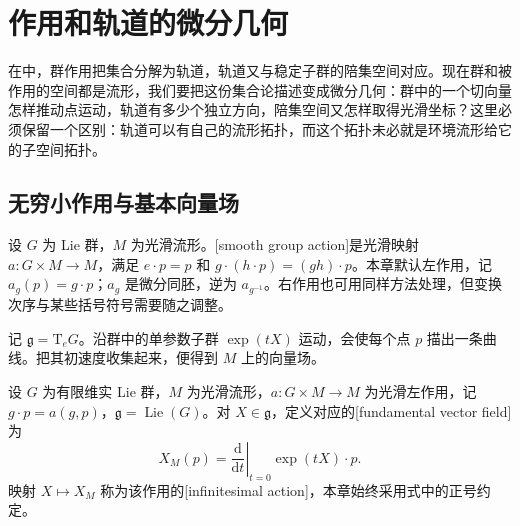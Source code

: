 
% 
% 

\section{作用和轨道的微分几何}
\label{g1:sec:1701}

在中，群作用把集合分解为轨道，轨道又与稳定子群的陪集空间对应。现在群和被作用的空间都是流形，我们要把这份集合论描述变成微分几何：群中的一个切向量怎样推动点运动，轨道有多少个独立方向，陪集空间又怎样取得光滑坐标？这里必须保留一个区别：轨道可以有自己的流形拓扑，而这个拓扑未必就是环境流形给它的子空间拓扑。

\subsection{无穷小作用与基本向量场}
\label{g1:subsec:1701:01}

设 \(G\) 为 Lie 群，\(M\) 为光滑流形。[smooth group action]是光滑映射 \(a:G\times M\to M\)，满足 \(e\cdot p=p\) 和 \(g\cdot(h\cdot p)=(gh)\cdot p\)。本章默认左作用，记 \(a_g(p)=g\cdot p\)；\(a_g\) 是微分同胚，逆为 \(a_{g^{-1}}\)。右作用也可用同样方法处理，但变换次序与某些括号符号需要随之调整。

\ProseParagraphBreak

记 \(\mathfrak g=\mathrm{T}_eG\)。沿群中的单参数子群 \(\exp(tX)\) 运动，会使每个点 \(p\) 描出一条曲线。把其初速度收集起来，便得到 \(M\) 上的向量场。

\begin{definition}\label{g1:def:fundamental-vector-field}
	设 \(G\) 为有限维实 Lie 群，\(M\) 为光滑流形，\(a:G\times M\to M\) 为光滑左作用，记 \(g\cdot p=a(g,p)\)，\(\mathfrak g=\operatorname{Lie}(G)\)。对 \(X\in\mathfrak g\)，定义对应的[fundamental vector field]为
	\begin{equation}\label{g1:eq:fundamental-field-convention}
		X_M(p)=\left.\frac{\mathrm{d}}{\mathrm{d}t}\right|_{t=0}\exp(tX)\cdot p.
	\end{equation}
	映射 \(X\mapsto X_M\) 称为该作用的[infinitesimal action]，本章始终采用式中的正号约定。
\end{definition}

